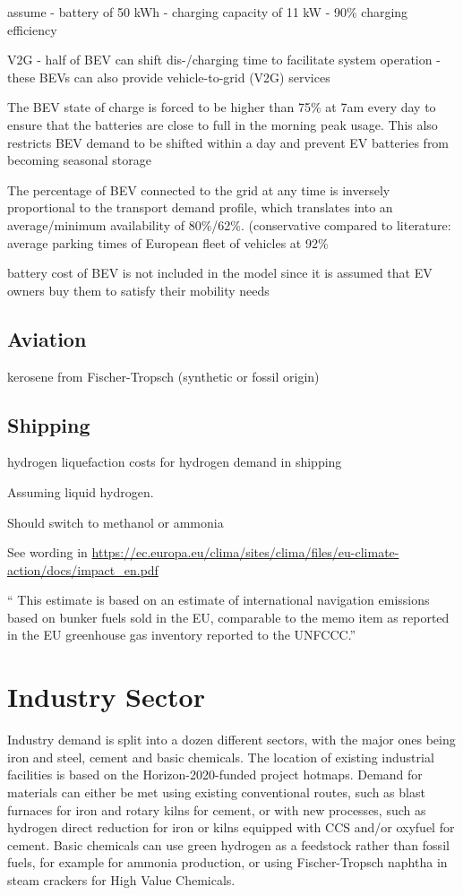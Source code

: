 assume
- battery of 50 kWh
- charging capacity of 11 kW
- 90\% charging efficiency

V2G
- half of BEV can shift dis-/charging time to facilitate system operation
- these BEVs can also provide vehicle-to-grid (V2G) services

The BEV state of charge is forced to be higher than 75\% at 7am every day
to ensure that the batteries are close to full in the morning peak usage.
This also restricts BEV demand to be shifted within a day and prevent EV
batteries from becoming seasonal storage

The percentage of BEV connected to the grid at any time is inversely proportional
to the transport demand profile, which translates into an average/minimum availability of 80\%/62\%.
(conservative compared to literature: average parking times of European fleet of vehicles at 92\%

battery cost of BEV is not included in the model since it is assumed that EV owners buy
them to satisfy their mobility needs

\subsection{Aviation}

kerosene from Fischer-Tropsch (synthetic or fossil origin)

\subsection{Shipping}

hydrogen liquefaction costs for hydrogen demand in shipping

Assuming liquid hydrogen.

Should switch to methanol or ammonia

See wording in
\url{https://ec.europa.eu/clima/sites/clima/files/eu-climate-action/docs/impact_en.pdf}

`` This estimate is based on an estimate of international navigation emissions
based on bunker fuels sold in the EU, comparable to the memo item as reported in
the EU greenhouse gas inventory reported to the UNFCCC.''


\section{Industry Sector}

Industry demand is split into a dozen different sectors, with the major ones
being iron and steel, cement and basic chemicals. The location of existing
industrial facilities is based on the Horizon-2020-funded project hotmaps.
Demand for materials can either be met using existing conventional routes, such
as blast furnaces for iron and rotary kilns for cement, or with new processes,
such as hydrogen direct reduction for iron or kilns equipped with CCS and/or
oxyfuel for cement. Basic chemicals can use green hydrogen as a feedstock rather
than fossil fuels, for example for ammonia production, or using Fischer-Tropsch
naphtha in steam crackers for High Value Chemicals.

